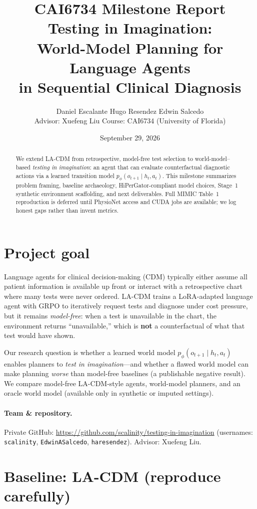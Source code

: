 \documentclass[11pt,letterpaper]{article}
\title{\textbf{CAI6734 Milestone Report}\\[0.35em]
\large Testing in Imagination:\\
World-Model Planning for Language Agents\\
in Sequential Clinical Diagnosis}
\author{Daniel Escalante \quad Hugo Resendez \quad Edwin Salcedo\\[0.4em]
\small Advisor: Xuefeng Liu \quad Course: CAI6734 (University of Florida)}
\date{September 29, 2026}
\begin{document}
\maketitle
\thispagestyle{empty}

\begin{abstract}
\noindent
We extend LA-CDM from retrospective, model-free test selection to world-model--based \emph{testing in imagination}: an agent that can evaluate counterfactual diagnostic actions via a learned transition model \(p_\phi(o_{t+1}\mid h_t,a_t)\). This milestone summarizes problem framing, baseline archaeology, HiPerGator-compliant model choices, Stage~1 synthetic environment scaffolding, and next deliverables. Full MIMIC Table~1 reproduction is deferred until PhysioNet access and CUDA jobs are available; we log honest gaps rather than invent metrics.
\end{abstract}

\section{Project goal}

Language agents for clinical decision-making (CDM) typically either assume all patient information is available up front or interact with a retrospective chart where many tests were never ordered. LA-CDM trains a LoRA-adapted language agent with GRPO to iteratively request tests and diagnose under cost pressure, but it remains \emph{model-free}: when a test is unavailable in the chart, the environment returns ``unavailable,'' which is \textbf{not} a counterfactual of what that test would have shown.

Our research question is whether a learned world model \(p_\phi(o_{t+1}\mid h_t,a_t)\) enables planners to \emph{test in imagination}---and whether a flawed world model can make planning \emph{worse} than model-free baselines (a publishable negative result). We compare model-free LA-CDM-style agents, world-model planners, and an oracle world model (available only in synthetic or imputed settings).

\paragraph{Team \& repository.}
Private GitHub: \url{https://github.com/scalinity/testing-in-imagination} (usernames: \texttt{scalinity}, \texttt{EdwinASalcedo}, \texttt{haresendez}). Advisor: Xuefeng Liu.

\section{Baseline: LA-CDM (reproduce carefully)}
\end{document}
